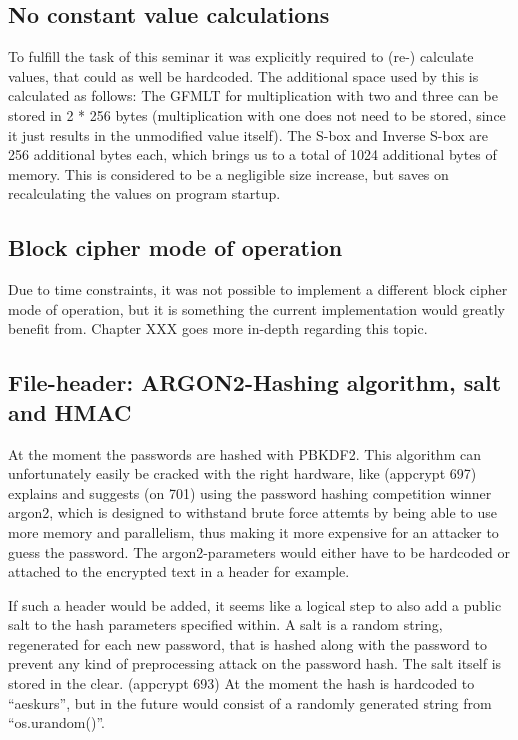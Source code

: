 \hypertarget{no-constant-value-calculations}{%
\subsection{No constant value
calculations}\label{no-constant-value-calculations}}

To fulfill the task of this seminar it was explicitly required to (re-)
calculate values, that could as well be hardcoded. The additional space
used by this is calculated as follows: The GFMLT for multiplication with
two and three can be stored in 2 * 256 bytes (multiplication with one
does not need to be stored, since it just results in the unmodified
value itself). The S-box and Inverse S-box are 256 additional bytes
each, which brings us to a total of 1024 additional bytes of memory.
This is considered to be a negligible size increase, but saves on
recalculating the values on program startup.

\hypertarget{block-cipher-mode-of-operation}{%
\subsection{Block cipher mode of
operation}\label{block-cipher-mode-of-operation}}

Due to time constraints, it was not possible to implement a different
block cipher mode of operation, but it is something the current
implementation would greatly benefit from. Chapter XXX goes more
in-depth regarding this topic.

\hypertarget{file-header-argon2-hashing-algorithm-salt-and-hmac}{%
\subsection{File-header: ARGON2-Hashing algorithm, salt and
HMAC}\label{file-header-argon2-hashing-algorithm-salt-and-hmac}}

At the moment the passwords are hashed with PBKDF2. This algorithm can
unfortunately easily be cracked with the right hardware, like (appcrypt
697) explains and suggests (on 701) using the password hashing
competition winner argon2, which is designed to withstand brute force
attemts by being able to use more memory and parallelism, thus making it
more expensive for an attacker to guess the password. The
argon2-parameters would either have to be hardcoded or attached to the
encrypted text in a header for example.

If such a header would be added, it seems like a logical step to also
add a public salt to the hash parameters specified within. A salt is a
random string, regenerated for each new password, that is hashed along
with the password to prevent any kind of preprocessing attack on the
password hash. The salt itself is stored in the clear. (appcrypt 693) At
the moment the hash is hardcoded to ``aeskurs'', but in the future would
consist of a randomly generated string from ``os.urandom()''.

